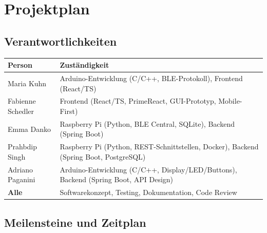\documentclass[12pt,a4paper]{article}
\begin{document}
\section{Projektplan}

\subsection{Verantwortlichkeiten}

\begin{center}
\begin{tabularx}{\textwidth}{lX}
  \toprule
  \textbf{Person} & \textbf{Zuständigkeit} \\
  \midrule
  Maria Kuhn      & Arduino-Entwicklung (C/C++, BLE-Protokoll), Frontend (React/TS) \\
  Fabienne Schedler & Frontend (React/TS, PrimeReact, GUI-Prototyp, Mobile-First) \\
  Emma Danko      & Raspberry Pi (Python, BLE Central, SQLite), Backend (Spring Boot) \\
  Prahbdip Singh  & Raspberry Pi (Python, REST-Schnittstellen, Docker), Backend (Spring Boot, PostgreSQL) \\
  Adriano Paganini & Arduino-Entwicklung (C/C++, Display/LED/Buttons), Backend (Spring Boot, API Design) \\
  \midrule
  \textbf{Alle} & Softwarekonzept, Testing, Dokumentation, Code Review \\
  \bottomrule
\end{tabularx}
\end{center}

\subsection{Meilensteine und Zeitplan}
\end{document}
